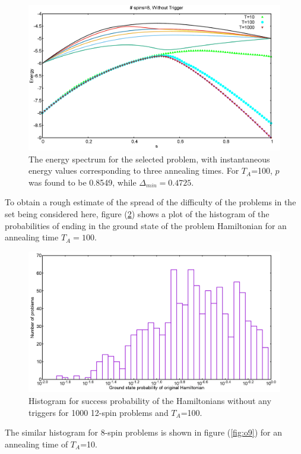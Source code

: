 \documentclass[../main.tex]{subfiles}
\begin{document}
\begin{figure}[H]
\centering 
\includegraphics[scale=0.3]{59_s8_O.png}
\caption{The energy spectrum for the selected problem, with instantaneous energy values corresponding to three annealing times. For $T_A$=100, $p$ was found to be 0.8549, while $\Delta_{min}=0.4725.$}
\label{fig:o7}
\end{figure}
\newpage
To obtain a rough estimate of the spread of the difficulty of the problems in the set being considered here, figure (\ref{fig:o8}) shows a plot of the histogram of the probabilities of ending in the ground state of the problem Hamiltonian for an annealing time $T_A=100$. 
\begin{figure}[H]
\centering 
\includegraphics[scale=0.3]{O_s12_T100_g0.png}
\caption{Histogram for success probability of the Hamiltonians without any triggers for 1000 12-spin problems and $T_A$=100.}
\label{fig:o8}
\end{figure}
The similar histogram for 8-spin problems is shown in figure (\ref{fig:o9}) for an annealing time of $T_A$=10.
\end{document}
